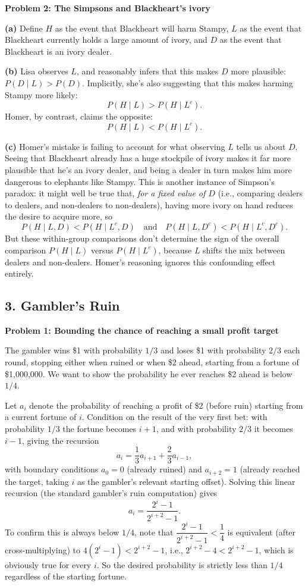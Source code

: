 \documentclass{article}
\begin{document}
\bigskip
\textbf{Problem 2: The Simpsons and Blackheart's ivory}

\textbf{(a)} Define $H$ as the event that Blackheart will harm Stampy, $L$ as the event that Blackheart currently holds a large amount of ivory, and $D$ as the event that Blackheart is an ivory dealer.

\medskip
\textbf{(b)} Lisa observes $L$, and reasonably infers that this makes $D$ more plausible: $P(D\mid L) > P(D)$. Implicitly, she's also suggesting that this makes harming Stampy more likely:
$$P(H\mid L) > P(H\mid L^c).$$
Homer, by contrast, claims the opposite:
$$P(H\mid L) < P(H\mid L^c).$$

\medskip
\textbf{(c)} Homer's mistake is failing to account for what observing $L$ tells us about $D$. Seeing that Blackheart already has a huge stockpile of ivory makes it far more plausible that he's an ivory dealer, and being a dealer in turn makes him more dangerous to elephants like Stampy. This is another instance of Simpson's paradox: it might well be true that, \emph{for a fixed value of $D$} (i.e., comparing dealers to dealers, and non-dealers to non-dealers), having more ivory on hand reduces the desire to acquire more, so
$$P(H\mid L,D) < P(H\mid L^c,D) \quad\text{and}\quad P(H\mid L,D^c) < P(H\mid L^c,D^c).$$
But these within-group comparisons don't determine the sign of the overall comparison $P(H\mid L)$ versus $P(H\mid L^c)$, because $L$ shifts the mix between dealers and non-dealers. Homer's reasoning ignores this confounding effect entirely.

\subsection*{3. Gambler's Ruin}

\textbf{Problem 1: Bounding the chance of reaching a small profit target}

The gambler wins \$1 with probability $1/3$ and loses \$1 with probability $2/3$ each round, stopping either when ruined or when \$2 ahead, starting from a fortune of \$1{,}000{,}000. We want to show the probability he ever reaches \$2 ahead is below $1/4$.

Let $a_i$ denote the probability of reaching a profit of \$2 (before ruin) starting from a current fortune of $i$. Condition on the result of the very first bet: with probability $1/3$ the fortune becomes $i+1$, and with probability $2/3$ it becomes $i-1$, giving the recursion
$$
a_i = \frac{1}{3}a_{i+1} + \frac{2}{3}a_{i-1},
$$
with boundary conditions $a_0 = 0$ (already ruined) and $a_{i+2}=1$ (already reached the target, taking $i$ as the gambler's relevant starting offset). Solving this linear recursion (the standard gambler's ruin computation) gives
$$
a_i = \frac{2^i - 1}{2^{i+2}-1}.
$$
To confirm this is always below $1/4$, note that $\dfrac{2^i-1}{2^{i+2}-1} < \dfrac{1}{4}$ is equivalent (after cross-multiplying) to $4(2^i-1) < 2^{i+2}-1$, i.e., $2^{i+2}-4 < 2^{i+2}-1$, which is obviously true for every $i$. So the desired probability is strictly less than $1/4$ regardless of the starting fortune.
\end{document}
